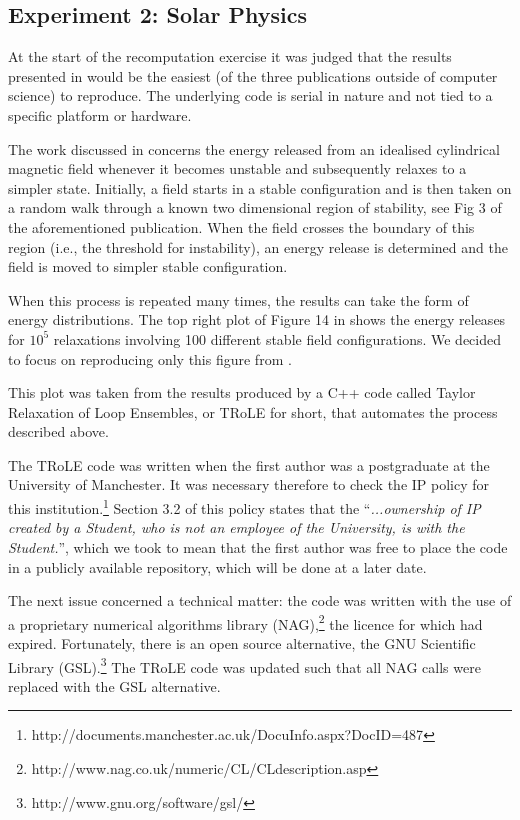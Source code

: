 \subsection*{Experiment 2: Solar Physics}

At the start of the recomputation exercise it was judged that the results presented in \cite{bareford2010nanoflare}
would be the easiest (of the three publications outside of computer science) to reproduce. The underlying
code is serial in nature and not tied to a specific platform or hardware. 

The work discussed in \cite{bareford2010nanoflare} concerns the energy released from an idealised cylindrical magnetic
field whenever it becomes unstable and subsequently relaxes to a simpler state. Initially, a field starts in a
stable configuration and is then taken on a random walk through a known two dimensional region of stability, see Fig 3 of
the aforementioned publication. When the field crosses the boundary of this region (i.e., the threshold for instability),
an energy release is determined and the field is moved to simpler stable configuration. 

When this process is repeated many times, the results can take the form of energy distributions. The top right plot
of Figure 14 in \cite{bareford2010nanoflare} shows the energy releases for $10^5$ relaxations involving 100 different stable field
configurations. We decided to focus on reproducing only this figure from \cite{bareford2010nanoflare}.

This plot was taken from the results produced by a C++ code called Taylor Relaxation of Loop Ensembles, or TRoLE
for short, that automates the process described above.

The TRoLE code was written when the first author was a postgraduate at the University of Manchester. It was
necessary therefore to check the IP policy for this institution.\footnote{http://documents.manchester.ac.uk/DocuInfo.aspx?DocID=487} Section 3.2 of this policy states that the ``\emph{...ownership
of IP created by a Student, who is not an employee of the University, is with the Student.}'', which we took to mean
that the first author was free to place the code in a publicly available repository, which will be done at a later date.

The next issue concerned a technical matter: the code was written with the use of a proprietary numerical algorithms
library (NAG),\footnote{http://www.nag.co.uk/numeric/CL/CLdescription.asp} the licence for which had expired. Fortunately, there is an open source alternative, the GNU Scientific
Library (GSL).\footnote{http://www.gnu.org/software/gsl/} The TRoLE code was updated such that all NAG calls were replaced with the GSL alternative. 

